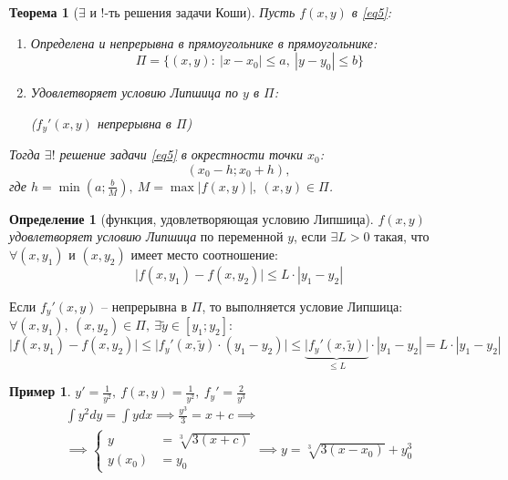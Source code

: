 \documentclass[11pt,a4paper,oneside]{report}
\theoremstyle{definition}
\newtheorem{definition}{Определение}[section]
\newtheorem{example}{Пример}
\theoremstyle{plain}
\newtheorem{theorem}{Теорема}[section]
\theoremstyle{remark}
\begin{document}
\begin{theorem}[$\exists$ и $!$-ть решения задачи Коши]
    Пусть $f(x,y)$ в \ref{eq5}:
    \begin{enumerate}
        \item Определена и непрерывна в прямоугольнике в прямоугольнике:
              \begin{equation*}
                  \Pi = \big\{(x,y): \ |x - x_0| \leqslant a, \ |y - y_0| \leqslant b\big\}
              \end{equation*}
        \item Удовлетворяет условию Липшица по $y$ в $\Pi$:
              \begin{center}
                  \big($f_y'(x,y)$ непрерывна в $\Pi$\big)
              \end{center}
    \end{enumerate}

    Тогда $\exists !$ решение задачи \ref{eq5} в окрестности точки $x_0$:
    \begin{equation*}
        (x_0 - h; x_0 + h),
    \end{equation*}
    где $h = \min\left(a;\frac{b}{M}\right), \ M = \max|f(x,y)|, \ (x,y) \in \Pi$.
\end{theorem}

\begin{definition}[функция, удовлетворяющая условию Липшица]
    $f(x,y)$ \emph{удовлетворяет условию Липшица} по переменной $y$, если $\exists L > 0$ такая, что $\forall (x,y_1)$ и $(x,y_2)$ имеет место соотношение:
    \begin{equation*}
        \big|f(x,y_1) - f(x,y_2)\big| \leqslant L \cdot|y_1 - y_2|
    \end{equation*}

    Если $f_y'(x,y)$ -- непрерывна в $\Pi$, то выполняется условие Липшица: $\forall (x,y_1), \ (x,y_2) \in \Pi, \ \exists \widetilde{y} \in [y_1;y_2]$:
    \begin{equation*}
        \big|f(x,y_1) - f(x,y_2)\big| \leqslant \big|f_y'(x,\widetilde{y}) \cdot (y_1 - y_2)\big| \leqslant \underbrace{\big|f_y'(x,\widetilde{y})\big|}_{\leqslant L}\cdot|y_1 - y_2| = L\cdot|y_1 - y_2|
    \end{equation*}
\end{definition}

\begin{example}
    $y' = \frac{1}{y^2}, \ f(x,y) = \frac{1}{y^2}, \ f_y'=\frac{2}{y^3}$
    \begin{multline*}
        \int y^2dy = \int ydx \implies \frac{y^3}{3} = x + c \implies \\
        \implies \left\{\begin{array}{rl}
            y      & = \sqrt[3]{3(x + c)} \\
            y(x_0) & = y_0
        \end{array}\right. \implies y = \sqrt[3]{3(x-x_0)} + y_0^3
    \end{multline*}
\end{example}
\end{document}
